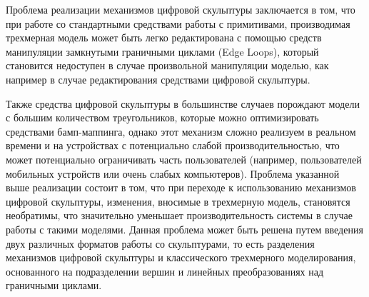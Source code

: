 Проблема реализации механизмов цифровой скульптуры заключается в том, что при работе со стандартными средствами работы с примитивами, производимая трехмерная модель может быть
легко редактирована с помощью средств манипуляции замкнутыми граничными циклами (Edge Loops), который становится недоступен в случае произвольной манипуляции моделью, как например в случае
редактирования средствами цифровой скульптуры.

Также средства цифровой скульптуры в большинстве случаев порождают модели с большим количеством треугольников, которые можно оптимизировать средствами бамп-маппинга, однако этот
механизм сложно реализуем в реальном времени и на устройствах с потенциально слабой производительностью, что может потенциально ограничивать часть пользователей (например, пользователей
мобильных устройств или очень слабых компьютеров). Проблема указанной выше реализации состоит в том, что при переходе к использованию механизмов цифровой скульптуры, изменения, вносимые
в трехмерную модель, становятся необратимы, что значительно уменьшает производительность системы в случае работы с такими моделями. Данная проблема может быть решена путем введения двух
различных форматов работы со скульптурами, то есть разделения механизмов цифровой скульптуры и классического трехмерного моделирования, основанного на подразделении вершин и линейных
преобразованиях над граничными циклами.
